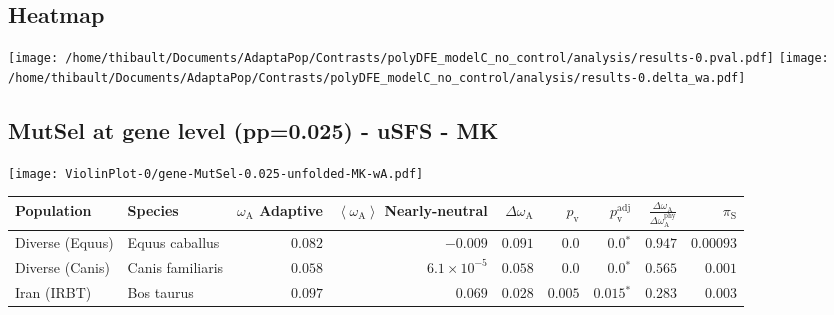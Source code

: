 \subsection{Heatmap} 
\begin{center}
\texttt{[image: /home/thibault/Documents/AdaptaPop/Contrasts/polyDFE\_modelC\_no\_control/analysis/results-0.pval.pdf]} 
\texttt{[image: /home/thibault/Documents/AdaptaPop/Contrasts/polyDFE\_modelC\_no\_control/analysis/results-0.delta\_wa.pdf]} 
\end{center}
\subsection{MutSel at gene level (pp=0.025) - uSFS - MK} 
\begin{center}
\texttt{[image: ViolinPlot-0/gene-MutSel-0.025-unfolded-MK-wA.pdf]} 
\begin{adjustbox}{width = 1\textwidth}
\begin{tabular}{|l|l|r|r|r|r|r|r|r|}
\toprule
                     Population &              Species & \specialcell{$\omega_{\mathrm{A}}$ \\ Adaptive} & \specialcell{$\left< \omega_{\mathrm{A}} \right>$ \\ Nearly-neutral} & $\Delta \omega_{\mathrm{A}} $ & $p_{\mathrm{v}}$ & $p_{\mathrm{v}}^{\mathrm{adj}}$ & $\frac{\Delta\omega_{\mathrm{A}}}{\Delta\omega_{\mathrm{A}}^{\mathrm{phy}}}$ & $\pi_{\textrm{S}}$ \\
\midrule
                Diverse (Equus) &       Equus caballus &                                        $ 0.082$ &                                           $-0.009$ &                      $ 0.091$ &            $0.0$ &                  $\bm{0.0{^*}}$ &                                           $ 0.947$ &          $0.00093$ \\
                Diverse (Canis) &     Canis familiaris &                                        $ 0.058$ &                                $6.1\times 10^{-5}$ &                      $ 0.058$ &            $0.0$ &                  $\bm{0.0{^*}}$ &                                           $ 0.565$ &           $ 0.001$ \\
                    Iran (IRBT) &           Bos taurus &                                        $ 0.097$ &                                           $ 0.069$ &                      $ 0.028$ &         $ 0.005$ &               $\bm{ 0.015{^*}}$ &                                           $ 0.283$ &           $ 0.003$ \\

\end{tabular}
\end{adjustbox}
\end{center}
